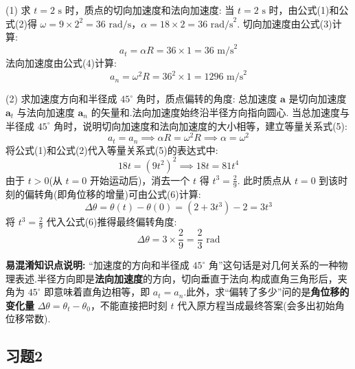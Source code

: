 (1) 求 $t = 2\text{ s}$ 时，质点的切向加速度和法向加速度:
当 $t = 2\text{ s}$ 时，由公式(1)和公式(2)得 $\omega = 9 \times 2^2 = 36 \text{ rad/s}$，$\alpha = 18 \times 2 = 36 \text{ rad/s}^2$.
切向加速度由公式(3)计算:
\begin{equation}
	a_t = \alpha R = 36 \times 1 = 36 \text{ m/s}^2
\end{equation}
法向加速度由公式(4)计算:
\begin{equation}
	a_n = \omega^2 R = 36^2 \times 1 = 1296 \text{ m/s}^2
\end{equation}

(2) 求加速度方向和半径成 $45^\circ$ 角时，质点偏转的角度:
总加速度 $\mathbf{a}$ 是切向加速度 $\mathbf{a}_t$ 与法向加速度 $\mathbf{a}_n$ 的矢量和.法向加速度始终沿半径方向指向圆心.
当总加速度与半径成 $45^\circ$ 角时，说明切向加速度和法向加速度的大小相等，建立等量关系式(5):
\begin{equation}
	a_t = a_n \implies \alpha R = \omega^2 R \implies \alpha = \omega^2
\end{equation}
将公式(1)和公式(2)代入等量关系式(5)的表达式中:
$$ 18t = (9t^2)^2 \implies 18t = 81t^4 $$
由于 $t > 0$(从 $t=0$ 开始运动后)，消去一个 $t$ 得 $t^3 = \frac{2}{9}$.
此时质点从 $t=0$ 到该时刻的偏转角(即角位移的增量)可由公式(6)计算:
\begin{equation}
	\Delta\theta = \theta(t) - \theta(0) = (2 + 3t^3) - 2 = 3t^3
\end{equation}
将 $t^3 = \frac{2}{9}$ 代入公式(6)推得最终偏转角度:
$$ \Delta\theta = 3 \times \frac{2}{9} = \frac{2}{3} \text{ rad} $$

\textbf{易混淆知识点说明:}
“加速度的方向和半径成 $45^\circ$ 角”这句话是对几何关系的一种物理表述.半径方向即是\textbf{法向加速度}的方向，切向垂直于法向.构成直角三角形后，夹角为 $45^\circ$ 即意味着直角边相等，即 $a_t = a_n$.此外，求“偏转了多少”问的是\textbf{角位移的变化量} $\Delta\theta = \theta_t - \theta_0$，不能直接把时刻 $t$ 代入原方程当成最终答案(会多出初始角位移常数).
\newpage

\subsection{习题2}


